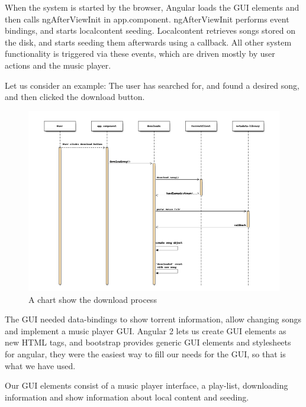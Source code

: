 When the system is started by the browser,
Angular loads the \acs{GUI} elements and then calls ngAfterViewInit in app.component.
ngAfterViewInit performs event bindings, and starts localcontent seeding.
Localcontent retrieves songs stored on the disk, and starts seeding them afterwards using a callback.
All other system functionality is triggered via these events, 
which are driven mostly by user actions and the music player.
\newline

Let us consider an example: The user has searched for, 
and found a desired song, and then clicked the download button.

\begin{figure}[H]
	\centerline{
	\includegraphics[width=1.5\linewidth]{gfx/downloadsong.png}
	}
	\caption{A chart show the download process}
	\label{fig:downloadsong}
\end{figure}


The \acs{GUI} needed data-bindings to show torrent information, allow changing songs
and implement a music player \acs{GUI}. 
Angular 2 lets us create \acs{GUI} elements as new \acs{HTML} tags, 
and bootstrap provides generic \acs{GUI} elements and stylesheets for angular, 
they were the easiest way to fill our needs for the \acs{GUI},
so that is what we have used.

Our \acs{GUI} elements consist of a music player interface, a play-list, downloading information 
and show information about local content and seeding.
\newline


